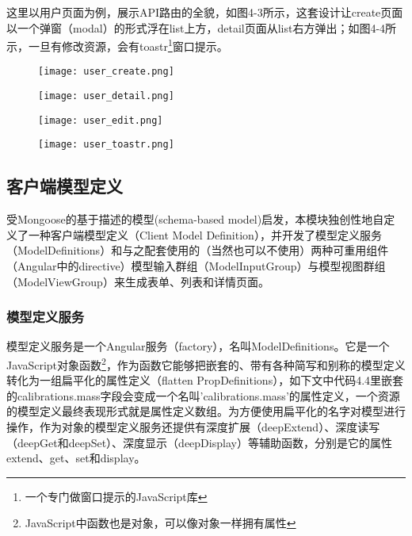 这里以用户页面为例，展示API路由的全貌，如图4-3所示，这套设计让create页面以一个弹窗（modal）的形式浮在list上方，detail页面从list右方弹出；如图4-4所示，一旦有修改资源，会有toastr\footnote{一个专门做窗口提示的JavaScript库}窗口提示。
\begin{figure}[H]
 \centering
 \texttt{[image: user\_create.png]}

 \vspace{0.5cm}

 \texttt{[image: user\_detail.png]}
\end{figure}
\begin{figure}[H]
 \centering
 \texttt{[image: user\_edit.png]}

 \vspace{0.5cm}

 \texttt{[image: user\_toastr.png]}
\end{figure}

\subsection{客户端模型定义}
受Mongoose的基于描述的模型(schema-based model)启发，本模块独创性地自定义了一种客户端模型定义（Client Model Definition），并开发了模型定义服务（ModelDefinitions）和与之配套使用的（当然也可以不使用）两种可重用组件（Angular中的directive）模型输入群组（ModelInputGroup）与模型视图群组（ModelViewGroup）来生成表单、列表和详情页面。

\subsubsection{模型定义服务}
模型定义服务是一个Angular服务（factory），名叫ModelDefinitions。它是一个JavaScript对象函数\footnote{JavaScript中函数也是对象，可以像对象一样拥有属性}，作为函数它能够把嵌套的、带有各种简写和别称的模型定义转化为一组扁平化的属性定义（flatten PropDefinitions），如下文中代码4.4里嵌套的calibrations.mass字段会变成一个名叫'calibrations.mass'的属性定义，一个资源的模型定义最终表现形式就是属性定义数组。为方便使用扁平化的名字对模型进行操作，作为对象的模型定义服务还提供有深度扩展（deepExtend）、深度读写（deepGet和deepSet）、深度显示（deepDisplay）等辅助函数，分别是它的属性extend、get、set和display。

